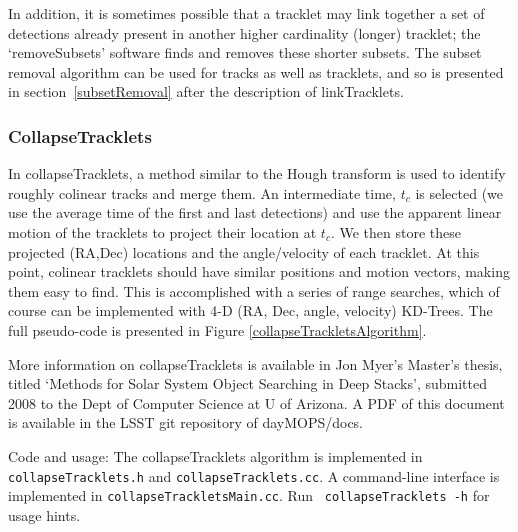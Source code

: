 In addition, it is sometimes possible that a tracklet may link
together a set of detections already present in another higher
cardinality (longer) tracklet; the `removeSubsets' software finds and
removes these shorter subsets. The subset removal algorithm can be
used for tracks as well as tracklets, and so is presented in
section~\ref{subsetRemoval} after the description of linkTracklets.


\subsubsection{CollapseTracklets} 

In collapseTracklets, a method similar to the Hough transform is used
to identify roughly colinear tracks and merge them. 
An intermediate time, $t_c$ is selected (we use the average time of
the first and last detections) and use the apparent linear motion of
the tracklets to project their location at $t_c$.  We then store these
projected (RA,Dec) locations and the angle/velocity of each tracklet.
At this point, colinear tracklets should have similar positions and
motion vectors, making them easy to find.  This is accomplished with a
series of range searches, which of course can be implemented with 4-D
(RA, Dec, angle, velocity) KD-Trees.  The full pseudo-code is
presented in Figure \ref{collapseTrackletsAlgorithm}.

More information on collapseTracklets is available in Jon Myer's
Master's thesis, titled `Methods for Solar System Object Searching in
Deep Stacks', submitted 2008 to the Dept of Computer Science at U of
Arizona. A PDF of this document is available in the LSST git
repository of dayMOPS/docs. 

Code and usage:  The collapseTracklets algorithm is implemented in {\tt
  collapseTracklets.h} and {\tt collapseTracklets.cc}.  A command-line
interface is implemented in {\tt collapseTrackletsMain.cc}.  Run {\tt
  collapseTracklets -h} for usage hints.


